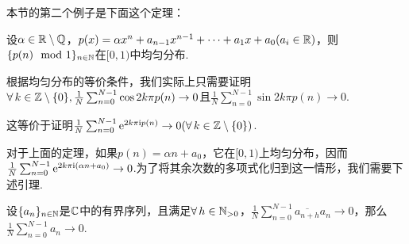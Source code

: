 本节的第二个例子是下面这个定理：
\begin{theorem}
    设$\alpha\in\mathbb{R}\setminus\mathbb{Q}$，$p(x)=\alpha x^n+a_{n-1}x^{n-1}+\cdots+a_1x+a_0(a_i\in\mathbb{R})$，则$\{p(n)\mod 1\}_{n\in\mathbb{N}}$在$[0,1)$中均匀分布.
\end{theorem}
根据均匀分布的等价条件，我们实际上只需要证明$\forall\, k\in\mathbb{Z}\setminus\{0\},\frac{1}{N}\sum_{n=0}^{N-1}{\cos{2k\pi p(n)}}\to 0$且$\frac{1}{N}\sum_{n=0}^{N-1}{\sin{2k\pi p(n)}}\to 0$.\par
这等价于证明$\frac{1}{N}\sum_{n=0}^{N-1}{\mathrm{e}^{2k\pi \mathrm{i} p(n)}}\to 0(\forall\, k\in\mathbb{Z}\setminus\{0\})$.\par
对于上面的定理，如果$p(n)=\alpha n+a_0$，它在$[0,1)$上均匀分布，因而$\frac{1}{N}\sum_{n=0}^{N-1}{\mathrm{e}^{2k\pi \mathrm{i}(\alpha n+a_0)}}\to 0$.为了将其余次数的多项式化归到这一情形，我们需要下述引理.\par
\begin{lemma}
    设$\{a_n\}_{n\in\mathbb{N}}$是$\mathbb{C}$中的有界序列，且满足$\forall\, h\in\mathbb{N}_{>0}$，$\frac{1}{N}\sum_{n=0}^{N-1}{\overline{a_{n+h}}a_n}\to 0$，那么$\frac{1}{N}\sum_{n=0}^{N-1}{a_n}\to 0$.
\end{lemma}
